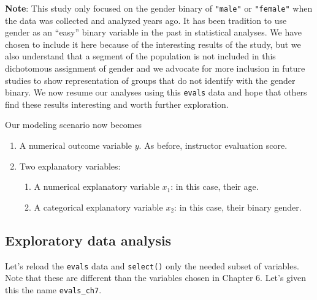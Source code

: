 \documentclass[12pt, krantz2,]{krantz}
\makeatletter
\newenvironment{Shaded}{\begin{snugshade}}{\end{snugshade}}
\newcommand{\KeywordTok}[1]{\textcolor[rgb]{0.27,0.27,0.27}{\textbf{#1}}}
\newcommand{\NormalTok}[1]{#1}
\newcommand{\OperatorTok}[1]{\textcolor[rgb]{0.43,0.43,0.43}{\textbf{#1}}}
\newcommand{\StringTok}[1]{\textcolor[rgb]{0.5,0.5,0.5}{#1}}
\providecommand{\tightlist}{%
  \setlength{\itemsep}{0pt}\setlength{\parskip}{0pt}}
\newenvironment{kframe}{%
\medskip{}
\setlength{\fboxsep}{.8em}
 \def\at@end@of@kframe{}%
 \ifinner\ifhmode%
  \def\at@end@of@kframe{\end{minipage}}%
  \begin{minipage}{\columnwidth}%
 \fi\fi%
 \def\FrameCommand##1{\hskip\@totalleftmargin \hskip-\fboxsep
 \colorbox{shadecolor}{##1}\hskip-\fboxsep
     \hskip-\linewidth \hskip-\@totalleftmargin \hskip\columnwidth}%
 \MakeFramed {\advance\hsize-\width
   \@totalleftmargin\z@ \linewidth\hsize
   \@setminipage}}%
 {\par\unskip\endMakeFramed%
 \at@end@of@kframe}
\renewenvironment{Shaded}{\begin{kframe}}{\end{kframe}}
\makeatother
\begin{document}
\textbf{Note}: This study only focused on the gender binary of \texttt{"male"} or \texttt{"female"} when the data was collected and analyzed years ago. It has been tradition to use gender as an ``easy'' binary variable in the past in statistical analyses. We have chosen to include it here because of the interesting results of the study, but we also understand that a segment of the population is not included in this dichotomous assignment of gender and we advocate for more inclusion in future studies to show representation of groups that do not identify with the gender binary. We now resume our analyses using this \texttt{evals} data and hope that others find these results interesting and worth further exploration.

Our modeling scenario now becomes

\begin{enumerate}
\def\labelenumi{\arabic{enumi}.}
\tightlist
\item
  A numerical outcome variable \(y\). As before, instructor evaluation score.
\item
  Two explanatory variables:

  \begin{enumerate}
  \def\labelenumii{\arabic{enumii}.}
  \tightlist
  \item
    A numerical explanatory variable \(x_1\): in this case, their age.
  \item
    A categorical explanatory variable \(x_2\): in this case, their binary gender.
  \end{enumerate}
\end{enumerate}

\hypertarget{model4EDA}{%
\subsection{Exploratory data analysis}\label{model4EDA}}

Let's reload the \texttt{evals} data and \texttt{select()} only the needed subset of variables. Note that these are different than the variables chosen in Chapter 6. Let's given this the name \texttt{evals\_ch7}.

\begin{Shaded}
\end{Shaded}
\end{document}
